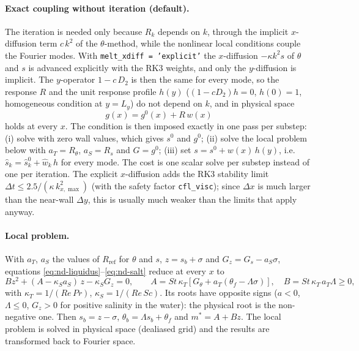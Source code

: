 \documentclass[11pt,a4paper]{article}
\begin{document}
\paragraph{Exact coupling without iteration (default).} The iteration is needed only because $R_k$
depends on $k$, through the implicit $x$-diffusion term $c\,k^2$ of the $\theta$-method, while the
nonlinear local conditions couple the Fourier modes. With \texttt{melt\_xdiff = 'explicit'} the
$x$-diffusion $-\kappa k^2 s$ of $\theta$ and $s$ is advanced explicitly with the RK3 weights, and only
the $y$-diffusion is implicit. The $y$-operator $1 - c\,D_2$ is then the same for every mode, so the
response $R$ and the unit response profile $h(y)$ ($(1-cD_2)h=0$, $h(0)=1$, homogeneous condition at
$y=L_y$) do not depend on $k$, and in physical space
\begin{equation}
  g(x) = g^0(x) + R\, w(x)
\end{equation}
holds at every $x$. The condition is then imposed exactly in one pass per substep: (i) solve with zero
wall values, which gives $s^0$ and $g^0$; (ii) solve the local problem below with $a_T=R_\theta$,
$a_S=R_s$ and $G=g^0$; (iii) set $s = s^0 + w(x)\,h(y)$, i.e.\ $\hat s_k = \hat s^0_k + \hat w_k\, h$ for
every mode. The cost is one scalar solve per substep instead of one per iteration. The explicit
$x$-diffusion adds the RK3 stability limit $\Delta t \le 2.5/(\kappa\, k_{x,\max}^2)$ (with the safety
factor \texttt{cfl\_visc}); since $\Delta x$ is much larger than the near-wall $\Delta y$, this is
usually much weaker than the limits that apply anyway.

\paragraph{Local problem.} With $a_T$, $a_S$ the values of $R_{\mathrm{ref}}$ for $\theta$ and $s$,
$z = s_b+\sigma$ and $G_z = G_s - a_S\sigma$, equations
\eqref{eq:nd-liquidus}--\eqref{eq:nd-salt} reduce at every $x$ to
\begin{equation}
  B z^2 + (A - \kappa_S a_S)\, z - \kappa_S G_z = 0, \qquad
  A = St\,\kappa_T\left[G_\theta + a_T(\theta_f - \Lambda\sigma)\right], \quad
  B = St\,\kappa_T\, a_T \Lambda \ge 0 ,
\end{equation}
with $\kappa_T = 1/(Re\,Pr)$, $\kappa_S = 1/(Re\,Sc)$. Its roots have opposite signs ($a<0$,
$\Lambda\le 0$, $G_z>0$ for positive salinity in the water): the physical root is the non-negative one.
Then $s_b = z-\sigma$, $\theta_b = \Lambda s_b + \theta_f$ and $m^* = A + Bz$. The local problem is solved
in physical space (dealiased grid) and the results are transformed back to Fourier space.
\end{document}
